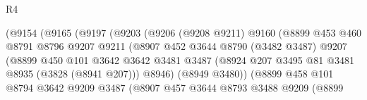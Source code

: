 \begin{lexlean}{R4}
\begin{coremodule}
                                (@9154
                                  (@9165
                                    (@9197
                                      (@9203
                                        (@9206
                                          (@9208 @9211)
                                          @9160
                                          (@8899
                                            @453
                                            @460
                                            @8791
                                            @8796
                                            @9207
                                            @9211
                                            (@8907
                                              @452
                                              @3644
                                              @8790
                                              (@3482 @3487)
                                              @9207
                                              (@8899
                                                @450
                                                @101
                                                @3642
                                                @3642
                                                @3481
                                                @3487
                                                (@8924
                                                  @207
                                                  @3495
                                                  @81
                                                  @3481
                                                  @8935
                                                  (@3828 (@8941 @207)))
                                                @8946)
                                              (@8949 @3480))
                                            (@8899
                                              @458
                                              @101
                                              @8794
                                              @3642
                                              @9209
                                              @3487
                                              (@8907
                                                @457
                                                @3644
                                                @8793
                                                @3488
                                                @9209
                                                (@8899

\end{coremodule}
\end{lexlean}
